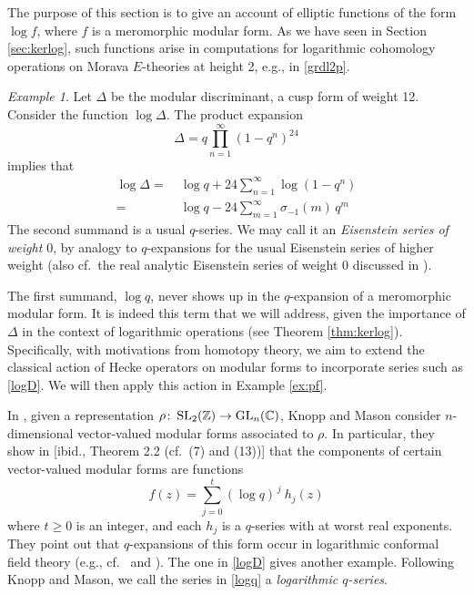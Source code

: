 \documentclass{gtpart}
\theoremstyle{definition}
\theoremstyle{remark}
\newtheorem{ex}[thm]{Example}
\def\co{\colon\thinspace}
\newcommand{\mb}[1]{\mathbb{#1}}
\newcommand{\BC}{{\mb C}}
\newcommand{\BZ}{{\mb Z}}
\renewcommand{\D}{\Delta}
\newcommand{\si}{\sigma}
\renewcommand{\=}{\approx}
\renewcommand{\-}{\sim}
\newcommand{\GL}{{\rm GL}}
\newcommand{\SL}{{\rm SL}}
\numberwithin{equation}{section}
\numberwithin{thm}{section}
\begin{document}
The purpose of this section is to give an account of elliptic functions of the form $\log f$, 
where $f$ is a meromorphic modular form.  
As we have seen in Section \ref{sec:kerlog}, such functions arise in computations 
for logarithmic cohomology operations on Morava $E$-theories at height 2, e.g., in \eqref{grdl2p}.  
\begin{ex}
 \label{ex:logD}
 Let $\D$ be the modular discriminant, a cusp form of weight 12.  
 Consider the function $\log \D$.  
 The product expansion 
 \[
  \D = q \prod_{n=1}^\infty (1 - q^n)^{24} 
 \]
 implies that 
 \begin{equation}
  \label{logD}
  \begin{split}
   \log \D = & ~ \log q + 24 \sum_{n=1}^\infty \log(1 - q^n) \\
           = & ~ \log q - 24 \sum_{m=1}^\infty \si_{-1}(m) \, q^m 
  \end{split}
 \end{equation}
 The second summand is a usual $q$-series.  
 We may call it an {\em Eisenstein series of weight $0$}, 
 by analogy to $q$-expansions for the usual Eisenstein series of higher weight 
 (also cf.~the real analytic Eisenstein series of weight 0 discussed in \cite[Sections 3.3 and 4.1]{Funke}).  

 The first summand, $\log q$, never shows up in the $q$-expansion of a meromorphic modular form.  
 It is indeed this term that we will address, 
 given the importance of $\D$ in the context of logarithmic operations (see Theorem \ref{thm:kerlog}).  
 Specifically, with motivations from homotopy theory, 
 we aim to extend the classical action of Hecke operators on modular forms to incorporate series such as \eqref{logD}.  
 We will then apply this action in Example \ref{ex:pf}.  
\end{ex}

In \cite{KnoppMason}, given a representation $\rho \co \SL_2(\BZ) \to \GL_n(\BC)$, 
Knopp and Mason consider $n$-dimensional vector-valued modular forms associated to $\rho$.  
In particular, they show in [ibid., Theorem 2.2 (cf.~(7) and (13))] that the components of certain vector-valued modular forms are functions 
\begin{equation}
 \label{logq}
 f(z) = \sum_{j=0}^t (\log q)^{\,j} ~\! h_j(z) 
\end{equation}
where $t \geq 0$ is an integer, and each $h_j$ is a $q$-series with at worst real exponents.  
They point out that $q$-expansions of this form occur in logarithmic conformal field theory 
(e.g., cf.~\cite[(5.3.9)]{Zhu} and \cite[(6.12)]{DongLiMason}).  
The one in \eqref{logD} gives another example.  
Following Knopp and Mason, we call the series in \eqref{logq} a {\em logarithmic $q$-series}.  
\end{document}
